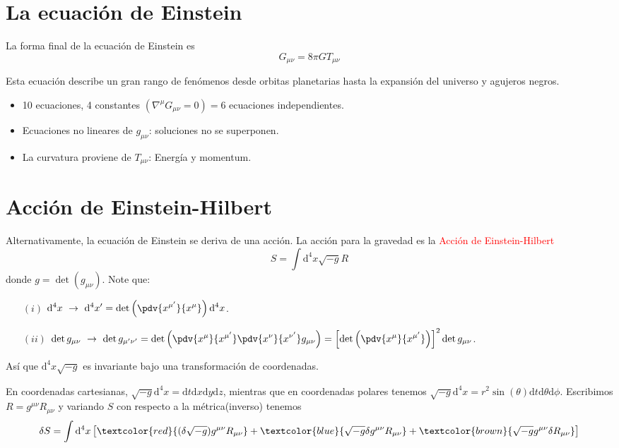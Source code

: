 \documentclass[../main]{subfiles}
\begin{document}
\begin{adjustwidth}{0pt}{-100pt}
\section{La ecuación de Einstein}\label{part5.2}

La forma final de la ecuación de Einstein es 
\begin{equation}
    G_{\mu\nu}=8\pi G T_{\mu\nu}
\end{equation}

Esta ecuación describe un gran rango de fenómenos desde orbitas planetarias hasta la expansión del universo y agujeros negros.
\begin{itemize}
    \item 10 ecuaciones, 4 constantes $(\nabla^{\mu} G_{\mu\nu}=0)=6$ ecuaciones independientes.
    \item Ecuaciones no lineares de $g_{\mu\nu}$: soluciones no se superponen.
    \item La curvatura proviene de $T_{\mu\nu}$: Energía y momentum.
\end{itemize}

\section{Acción de Einstein-Hilbert}\label{part5.3}

Alternativamente, la ecuación de Einstein se deriva de una acción. La acción para la gravedad es la \textcolor{red}{Acción de Einstein-Hilbert}
\begin{equation}
    S=\int \mathrm{d}^4 x \sqrt{-g} R
\end{equation}
donde $g=\det(g_{\mu\nu})$. Note que:
\begin{enumerate}
    \item[$(i)$] $\displaystyle \mathrm{d}^4 x \ \rightarrow \ \mathrm{d}^4 x'=\det\left(\pdv{x^{\mu'}}{x^{\mu}}\right)\mathrm{d}^4 x$.
    \item[$(ii)$] $\displaystyle \det g_{\mu\nu} \ \rightarrow \ \det g_{\mu'\nu'}=\det\left(\pdv{x^{\mu}}{x^{\mu'}}\pdv{x^{\nu}}{x^{\nu'}} g_{\mu\nu}\right)=\left[\det\left(\pdv{x^{\mu}}{x^{\mu'}}\right)\right]^2 \det g_{\mu\nu}$.  
\end{enumerate}

Así que $\mathrm{d}^4 x \sqrt{-g}$ es invariante bajo una transformación de coordenadas.

\ejemplo{} En coordenadas cartesianas, $\sqrt{-g} \mathrm{d}^4 x=\mathrm{d}t\mathrm{d}x\mathrm{d}y\mathrm{d}z$, mientras que en coordenadas polares tenemos $\sqrt{-g}\mathrm{d}^4 x=r^2\sin(\theta)\mathrm{d}t\mathrm{d}\theta\mathrm{d}\phi$. Escribimos $R=g^{\mu\nu}R_{\mu\nu}$ y variando $S$ con respecto a la métrica(inverso) tenemos 
\begin{equation}
    \delta S = \int \mathrm{d}^4 x \left[\textcolor{red}{(\delta \sqrt{-g})g^{\mu\nu}R_{\mu\nu}}+\textcolor{blue}{\sqrt{-g}\delta g^{\mu\nu}R_{\mu\nu}}+\textcolor{brown}{\sqrt{-g}g^{\mu\nu}\delta R_{\mu\nu}}\right]
\end{equation}


\end{adjustwidth}
\end{document}
